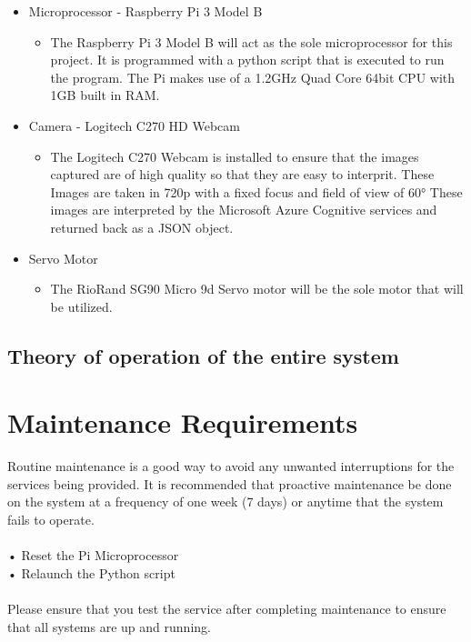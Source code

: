 \documentclass[a4paper,12pt]{article}
\begin{document}
\begin{itemize}
\item Microprocessor - Raspberry Pi 3 Model B
\begin{itemize}
    \item The Raspberry Pi 3 Model B will act as the sole microprocessor for this project. It is programmed with a python script that is executed to run the program. The Pi makes use of  a 1.2GHz Quad Core 64bit CPU with 1GB built in RAM.
\end{itemize} 
\item Camera - Logitech C270 HD Webcam
\begin{itemize}
    \item The Logitech C270 Webcam is installed to ensure that the images captured are of high quality so that they are easy to interprit. These Images are taken in 720p with a fixed focus and field of view of \ang{60} These images are interpreted by the Microsoft Azure Cognitive services and returned back as a JSON object.
\end{itemize}
\item Servo Motor
\begin{itemize}
    \item The RioRand SG90 Micro 9d Servo motor will be the sole motor that will be utilized. 
\end{itemize}
\end{itemize}

\subsection{Theory of operation of the entire system}

\newpage
\section{Maintenance Requirements}

Routine maintenance is a good way to avoid any unwanted interruptions for the services being provided. It is recommended that proactive maintenance be done on the system at a frequency of one week (7 days) or anytime that the system fails to operate.
\\
\\
    • Reset the Pi Microprocessor
\\
    •	Relaunch the Python script
\\
\\
Please ensure that you test the service after completing maintenance to ensure that all systems are up and running. 
\end{document}
